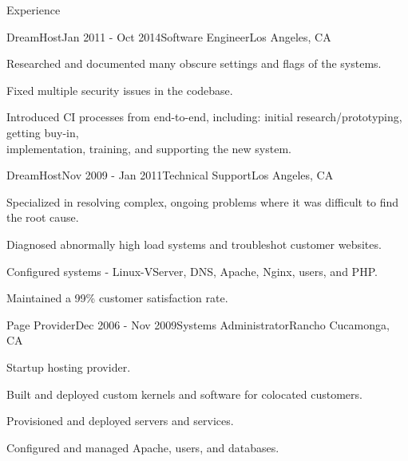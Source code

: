 \documentclass{resume} %
\begin{document}
\begin{rSection}{Experience}
\begin{rSubsection}{DreamHost}{Jan 2011 - Oct 2014}{Software Engineer}{Los Angeles, CA}
\item Researched and documented many obscure settings and flags of the systems.
\item Fixed multiple security issues in the codebase.
\item Introduced CI processes from end-to-end, including: initial research/prototyping, getting buy-in, \\ implementation, training, and supporting the new system.
\end{rSubsection}


\begin{rSubsection}{DreamHost}{Nov 2009 - Jan 2011}{Technical Support}{Los Angeles, CA}
\item Specialized in resolving complex, ongoing problems where it was difficult to find the root cause.
\item Diagnosed abnormally high load systems and troubleshot customer websites.
\item Configured systems - Linux-VServer, DNS, Apache, Nginx, users, and PHP.
\item Maintained a 99\% customer satisfaction rate.
\end{rSubsection}


\begin{rSubsection}{Page Provider}{Dec 2006 - Nov 2009}{Systems Administrator}{Rancho Cucamonga, CA}
\item Startup hosting provider.
\item Built and deployed custom kernels and software for colocated customers.
\item Provisioned and deployed servers and services.
\item Configured and managed Apache, users, and databases.
\end{rSubsection}

\end{rSection}

\end{document}
